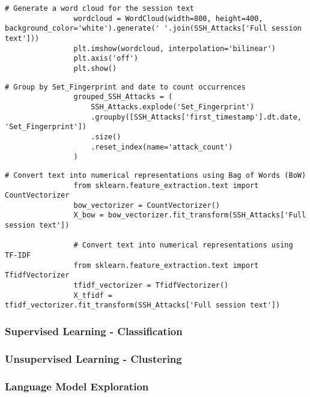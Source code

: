             \begin{lstlisting}[caption={Generate a word cloud from session text}, label={lst:generate-wordcloud}]
                # Generate a word cloud for the session text
                wordcloud = WordCloud(width=800, height=400, background_color='white').generate(' '.join(SSH_Attacks['Full session text']))
                plt.imshow(wordcloud, interpolation='bilinear')
                plt.axis('off')
                plt.show()
            \end{lstlisting}

            \begin{lstlisting}[caption={Group attacks by fingerprint and date}, label={lst:group-attacks}]
                # Group by Set_Fingerprint and date to count occurrences
                grouped_SSH_Attacks = (
                    SSH_Attacks.explode('Set_Fingerprint')
                    .groupby([SSH_Attacks['first_timestamp'].dt.date, 'Set_Fingerprint'])
                    .size()
                    .reset_index(name='attack_count')
                )
            \end{lstlisting}

            \begin{lstlisting}[caption={Convert text into numerical representations}, label={lst:convert-text-numerical}]
                # Convert text into numerical representations using Bag of Words (BoW)
                from sklearn.feature_extraction.text import CountVectorizer
                bow_vectorizer = CountVectorizer()
                X_bow = bow_vectorizer.fit_transform(SSH_Attacks['Full session text'])

                # Convert text into numerical representations using TF-IDF
                from sklearn.feature_extraction.text import TfidfVectorizer
                tfidf_vectorizer = TfidfVectorizer()
                X_tfidf = tfidf_vectorizer.fit_transform(SSH_Attacks['Full session text'])
            \end{lstlisting}

        \subsubsection{Supervised Learning - Classification}


        \subsubsection{Unsupervised Learning - Clustering}


        \subsubsection{Language Model Exploration}
